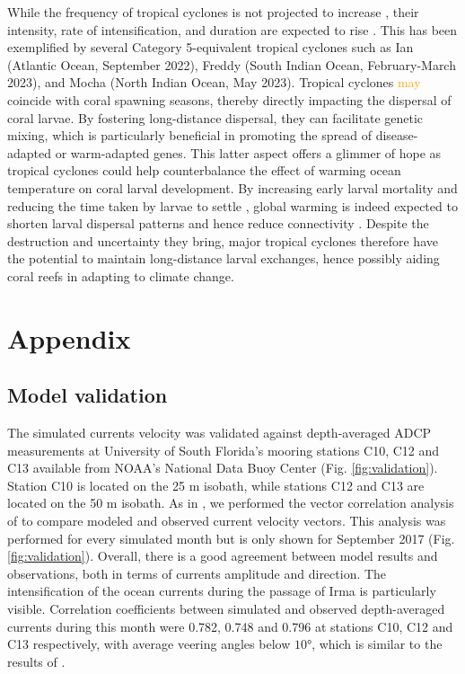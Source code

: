 \documentclass[fleqn,10pt]{wlscirep}
\newcommand{\emphc}[1]{\emph{\textcolor{red}{#1}}}
\newcommand{\modif}[1]{\textcolor{orange}{#1}}
\begin{document}
While the frequency of tropical cyclones is not projected to increase \citep{walsh2019tropical}, their intensity, rate of intensification, and duration are expected to rise \citep{bhatia2022potential}. This has been exemplified by several Category 5-equivalent tropical cyclones such as Ian (Atlantic Ocean, September 2022), Freddy (South Indian Ocean, February-March 2023), and Mocha (North Indian Ocean, May 2023). Tropical cyclones \modif{may} coincide with coral spawning seasons, thereby directly impacting the dispersal of coral larvae. By fostering long-distance dispersal, they can facilitate genetic mixing, which is particularly beneficial in promoting the spread of disease-adapted or warm-adapted genes. This latter aspect offers a glimmer of hope as tropical cyclones could help counterbalance the effect of warming ocean temperature on coral larval development. By increasing early larval mortality and reducing the time taken by larvae to settle \citep{nozawa2007effects, heyward2010plasticity}, global warming is indeed expected to shorten larval dispersal patterns and hence reduce connectivity \citep{Figueiredo2022Jan}. Despite the destruction and uncertainty they bring, major tropical cyclones therefore have the potential to maintain long-distance larval exchanges, hence possibly aiding coral reefs in adapting to climate change.


\section*{Appendix}
\subsection*{Model validation}
The simulated currents velocity was validated against depth-averaged ADCP measurements at University of South Florida's mooring stations C10, C12 and C13 available from NOAA's National Data Buoy Center (Fig. \ref{fig:validation}). Station C10 is located on the 25 m isobath, while stations C12 and C13 are located on the 50 m isobath. As in \cite{liu2020impacts}, we performed the vector correlation analysis of \citep{kundu1976ekman} to compare modeled and observed current velocity vectors. This analysis was performed for every simulated month but is only shown for September 2017 (Fig. \ref{fig:validation}). Overall, there is a good agreement between model results and observations, both in terms of currents amplitude and direction. The intensification of the ocean currents during the passage of Irma is particularly visible. Correlation coefficients between simulated and observed depth-averaged currents during this month were 0.782, 0.748 and 0.796 at stations C10, C12 and C13 respectively, with average veering angles below $10$°, which is similar to the results of \cite{liu2020impacts}.
\end{document}
